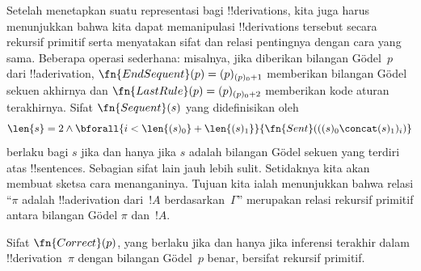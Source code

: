 \documentclass[../../../include/open-logic-section]{subfiles}
\begin{document}
\begin{explain}
Setelah menetapkan suatu representasi bagi !!{derivation}s, kita juga harus
menunjukkan bahwa kita dapat memanipulasi !!{derivation}s tersebut secara
rekursif primitif serta menyatakan sifat dan relasi pentingnya dengan cara yang
sama. Beberapa operasi sederhana: misalnya, jika diberikan bilangan
G\"odel~$p$ dari !!a{derivation}, $\fn{EndSequent}(p) = (p)_{(p)_0+1}$ memberikan
bilangan G\"odel sekuen akhirnya dan $\fn{LastRule}(p) = (p)_{(p)_0+2}$
memberikan kode aturan terakhirnya. Sifat $\fn{Sequent}(s)$ yang didefinisikan
oleh
\[
  \len{s} = 2 \land \bforall{i<\len{(s)_0} + \len{(s)_1}}{\fn{Sent}(((s)_0 \concat (s)_1)_i)}
\]
berlaku bagi $s$ jika dan hanya jika $s$ adalah bilangan G\"odel sekuen yang
terdiri atas !!{sentence}s. Sebagian sifat lain jauh lebih sulit. Setidaknya
kita akan membuat sketsa cara menanganinya. Tujuan kita ialah menunjukkan
bahwa relasi ``$\pi$ adalah !!a{derivation} dari~$!A$ berdasarkan~$\Gamma$''
merupakan relasi rekursif primitif antara bilangan G\"odel $\pi$ dan~$!A$.
\end{explain}

\begin{prop}
  Sifat $\fn{Correct}(p)$, yang berlaku jika dan hanya jika inferensi terakhir
  dalam !!{derivation}~$\pi$ dengan bilangan G\"odel~$p$ benar, bersifat
  rekursif primitif.
\end{prop}
\end{document}
